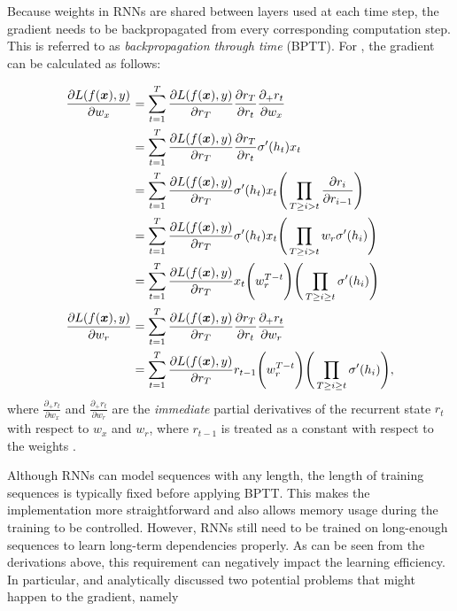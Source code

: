 Because weights in RNNs are shared between layers used at  each time step, the gradient needs to be backpropagated from every corresponding computation step. This is referred to as \textit{backpropagation through time} (BPTT). For \addfigure{\ref{fig:rnn_unfold}}, the gradient can be calculated as follows:

\begin{align*}
	\frac{ \partial L(f(\boldsymbol{x}), y)}{ \partial w_x } &= \sum_{t=1} ^{T} 	\frac{ \partial L(f(\boldsymbol{x}), y)}{ \partial r_T } \frac{ \partial r_T}{ \partial r_t } \frac{\partial_+r_t}{ \partial w_x} \\ 
				&= \sum_{t=1} ^{T} 	\frac{ \partial L(f(\boldsymbol{x}), y)}{ \partial r_T } \frac{ \partial r_T}{ \partial r_t } \sigma'(h_t)x_t \\
				&= \sum_{t=1} ^{T} 	\frac{ \partial L(f(\boldsymbol{x}), y)}{ \partial r_T } \sigma'(h_t)x_t \Bigg( \prod_{T \ge i > t} \frac{ \partial r_i}{ \partial r_{i-1} } \Bigg) \\
				&= \sum_{t=1} ^{T} 	\frac{ \partial L(f(\boldsymbol{x}), y)}{ \partial r_T } \sigma'(h_t)x_t \Bigg( \prod_{T \ge i > t} w_r \sigma'(h_i) \Bigg) \\
				&= \sum_{t=1} ^{T} 	\frac{ \partial L(f(\boldsymbol{x}), y)}{ \partial r_T }  x_t \Bigg( w_r^{T-t} \Bigg) \Bigg( \prod_{T \ge i \ge t} \sigma'(h_i) \Bigg) \\
\frac{\partial L(f(\boldsymbol{x}), y)}{\partial w_{r}} &=  \sum_{t=1} ^{T} 	\frac{ \partial L(f(\boldsymbol{x}), y)}{ \partial r_T } \frac{ \partial r_T}{ \partial r_t } \frac{\partial_+r_t}{ \partial w_r} \\
				&= \sum_{t=1} ^{T} 	\frac{ \partial L(f(\boldsymbol{x}), y)}{ \partial r_T }  r_{t-1} \Bigg( w_r^{T-t} \Bigg) \Bigg( \prod_{T \ge i \ge t} \sigma'(h_i) \Bigg),
\end{align*}
where $\frac{\partial_+r_t}{ \partial w_x}$ and  $\frac{\partial_+r_t}{ \partial w_r}$ are the \textit{immediate} partial derivatives  of the recurrent state $r_t$ with respect to $w_x$ and $w_r$, where $r_{t-1}$ is treated as a constant with respect to the weights \citep{Pascanudifficultytrainingrecurrent2013}.

Although RNNs can model sequences with any length, the length of training sequences is typically fixed before applying BPTT. This makes the implementation more straightforward and also allows memory usage during the training to be controlled. However, RNNs still need to be trained on long-enough sequences to learn long-term dependencies properly. As can be seen from the derivations above, this requirement can negatively impact the learning efficiency. In particular, \citet{BengioLearninglongtermdependencies1994} and \citet{ Pascanudifficultytrainingrecurrent2013} analytically discussed two potential problems that might happen to the gradient, namely

